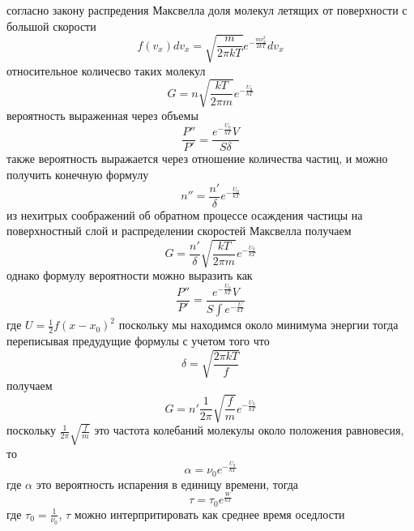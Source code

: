 \documentclass[a4paper, 12pt]{article}
\begin{document}
согласно закону распредения Максвелла доля молекул летящих от поверхности с большой скорости
\[f(v_x)dv_x = \sqrt{\frac{m}{2\pi kT}}e^{-\frac{mv^2_x}{2kT}}dv_x\]
относительное количесво таких молекул
\[G = n\sqrt{\frac{kT}{2\pi m}}e^{-\frac{U_0}{kT}}\]
вероятность выраженная через объемы
\[\frac{P''}{P'} = \frac{e^{-\frac{U_0}{kT}}V}{S\delta}\]
также вероятность выражается через отношение количества частиц, и можно получить конечную формулу
\[n'' = \frac{n'}{\delta} e^{-\frac{U_0}{kT}}\]
из нехитрых соображений об обратном процессе осаждения частицы на поверхностный слой и распределении скоростей Максвелла получаем
\[G = \frac{n'}{\delta}\sqrt{\frac{kT}{2\pi m}}e^{-\frac{U_0}{kT}}\]
однако формулу вероятности можно выразить как
\[\frac{P''}{P'} = \frac{e^{-\frac{U_0}{kT}}V}{S \int e^{-\frac{U}{kT}}}\]
где $U = \frac{1}{2}f(x-x_0)^2$ поскольку мы находимся около минимума энергии
тогда переписывая предудущие формулы с учетом того что 
\[\delta = \sqrt{\frac{2\pi kT}{f}}\]
получаем
\[G = n' \frac{1}{2\pi} \sqrt{\frac{f}{m}}e^{-\frac{U_0}{kT}}\]
поскольку $\frac{1}{2\pi} \sqrt{\frac{f}{m}}$ это частота колебаний молекулы около положения равновесия, то 
\[\alpha = \nu_0 e^{-\frac{U_0}{kT}}\]
где $\alpha$ это вероятность испарения в единицу времени, тогда
\[ \tau = \tau_0 e^{\frac{W}{kT}} \]
где $\tau_0 = \frac{1}{\nu_0}$, $\tau$ можно интерпритировать как среднее время оседлости 
\end{document}
